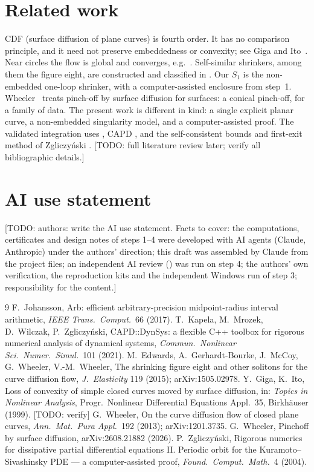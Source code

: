 \documentclass[11pt]{article}
\theoremstyle{definition}
\theoremstyle{remark}
\newcommand{\fn}[1]{\texttt{\detokenize{#1}}}
\newcommand{\todo}[1]{\textcolor{red!65!black}{\textsf{\small[TODO: #1]}}}
\begin{document}
\section{Related work}\label{s:rel}
CDF (surface diffusion of plane curves) is fourth order. It has no comparison principle, and it need not preserve embeddedness or convexity; see Giga and Ito~\cite{GI}. Near circles the flow is global and converges, e.g.\ \cite{Wh13}. Self-similar shrinkers, among them the figure eight, are constructed and classified in \cite{EGMWW}. Our $S_1$ is the non-embedded one-loop shrinker, with a computer-assisted enclosure from step~1. Wheeler~\cite{Wh26} treats pinch-off by surface diffusion for surfaces: a conical pinch-off, for a family of data. The present work is different in kind: a single explicit planar curve, a non-embedded singularity model, and a computer-assisted proof. The validated integration uses \fn{arb} \cite{Arb}, CAPD \cite{CAPD}, and the self-consistent bounds and first-exit method of Zgliczy\'nski \cite{Zg}. \todo{full literature review later; verify all bibliographic details.}

\section{AI use statement}
\todo{authors: write the AI use statement. Facts to cover: the computations, certificates and design notes of steps 1--4 were developed with AI agents (Claude, Anthropic) under the authors' direction; this draft was assembled by Claude from the project files; an independent AI review (\fn{STEP4_REVIEW.md}) was run on step 4; the authors' own verification, the reproduction kits and the independent Windows run of step 3; responsibility for the content.}

\begin{thebibliography}{9}\small
{} F.~Johansson, Arb: efficient arbitrary-precision midpoint-radius interval arithmetic, \emph{IEEE Trans.\ Comput.}\ 66 (2017).
 T.~Kapela, M.~Mrozek, D.~Wilczak, P.~Zgliczy\'nski, CAPD::DynSys: a flexible C++ toolbox for rigorous numerical analysis of dynamical systems, \emph{Commun.\ Nonlinear Sci.\ Numer.\ Simul.}\ 101 (2021).
 M.~Edwards, A.~Gerhardt-Bourke, J.~McCoy, G.~Wheeler, V.-M.~Wheeler, The shrinking figure eight and other solitons for the curve diffusion flow, \emph{J.\ Elasticity} 119 (2015); arXiv:1505.02978.
 Y.~Giga, K.~Ito, Loss of convexity of simple closed curves moved by surface diffusion, in: \emph{Topics in Nonlinear Analysis}, Progr.\ Nonlinear Differential Equations Appl.\ 35, Birkh\"auser (1999). \todo{verify}
 G.~Wheeler, On the curve diffusion flow of closed plane curves, \emph{Ann.\ Mat.\ Pura Appl.}\ 192 (2013); arXiv:1201.3735.
 G.~Wheeler, Pinchoff by surface diffusion, arXiv:2608.21882 (2026).
 P.~Zgliczy\'nski, Rigorous numerics for dissipative partial differential equations II. Periodic orbit for the Kuramoto--Sivashinsky PDE --- a computer-assisted proof, \emph{Found.\ Comput.\ Math.}\ 4 (2004).
\end{thebibliography}
\end{document}
